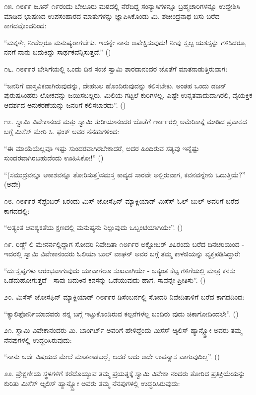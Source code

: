 ೧೫. ೧೮೯೯ ಜೂನ್ ೧೯ರಂದು ಬೇಲೂರು ಮಠದಲ್ಲಿ ನೆರೆದಿದ್ದ ಸಂನ್ಯಾಸಿಗಳನ್ನೂ ಬ್ರಹ್ಮಚಾರಿಗಳನ್ನೂ ಉದ್ದೇಶಿಸಿ ಮಾಡಿದ ಭಾಷಣದ ಉಪಸಂಹಾರದ ಮಾತುಗಳನ್ನು ಜ್ಞಾಪಿಸಿಕೊಂಡು ಮಿ. ಶಚೀಂದ್ರನಾಥ ಬಸು ಬರೆದ ಕಾಗದವೊಂದರಿಂದ:

“ಮಕ್ಕಳೇ, ನೀವೆಲ್ಲರೂ ಮನುಷ್ಯರಾಗಬೇಕು. ಇದನ್ನೇ ನಾನು ಅಪೇಕ್ಷಿಸುವುದು! ನೀವು ಸ್ವಲ್ಪ ಯಶಸ್ಸನ್ನು ಗಳಿಸಿದರೂ, ನನಗೆ ನಾನು ಬದುಕಿದ್ದು ಸಾರ್ಥಕವೆನ್ನಿಸುತ್ತದೆ.” ()

೧೬. ೧೮೯೯ರ ಬೇಸಿಗೆಯಲ್ಲಿ ಒಂದು ದಿನ ಸಂಜೆ ಸ್ವಾಮಿ ಶಾರದಾನಂದರ ಜೊತೆಗೆ ಮಾತನಾಡುತ್ತಿರುವಾಗ:

“ಜನರಿಗೆ ವಾಸ್ತವಿಕವಾಗಿರುವುದನ್ನು, ದೇಹಬಲ ಹೊಂದಿರುವುದನ್ನು ಕಲಿಸಬೇಕು. ಅಂತಹ ಒಂದು ಡಜನ್ ಪುರುಷಸಿಂಹರು ಲೋಕವನ್ನು ಜಯಿಸಬಲ್ಲರು, ಮಿಲಿಯ ಗಟ್ಟಲೆ ಕುರಿಗಳಲ್ಲ. ಎಷ್ಟೇ ಉನ್ನತವಾದುದಾಗಿರಲಿ, ವೈಯಕ್ತಿಕ ಆದರ್ಶದ ಅನುಕರಣೆಯನ್ನು ಜನರಿಗೆ ಕಲಿಸಬಾರದು”. ()

೧೭. ಸ್ವಾಮಿ ವಿವೇಕಾನಂದ ಮತ್ತು ಸ್ವಾಮಿ ತುರೀಯಾನಂದರ ಜೊತೆಗೆ ೧೮೯೯ರಲ್ಲಿ ಅಮೆರಿಕಾಕ್ಕೆ ಮಾಡಿದ ಪ್ರವಾಸದ ಬಗ್ಗೆ ಮಿಸೆಸ್ ಮೇರಿ ಸಿ. ಫಂಕ್ ಅವರ ನೆನಹುಗಳಿಂದ:

“ಈ ಮಾಯೆಯೆಲ್ಲವೂ ಇಷ್ಟು ಸುಂದರವಾಗಿರಬೇಕಾದರೆ, ಅದರ ಹಿಂದಿರುವ ಸತ್ಯವು ಇನ್ನೆಷ್ಟು ಸುಂದರವಾಗಿರಬಹುದೆಂದು ಊಹಿಸಿಕೋ!” ()

“(ಸಮುದ್ರವನ್ನೂ ಆಕಾಶವನ್ನೂ ತೋರಿಸುತ್ತ)ಸಮಸ್ತ ಕಾವ್ಯದ ಸಾರವೇ ಅಲ್ಲಿರುವಾಗ, ಕವನವನ್ನೇನು ಓದುತ್ತಿಯೆ?” (ಅದೇ)

೧೮. ೧೮೯೯ರ ಸೆಪ್ಟೆಂಬರ್ ೩ರಂದು ಮಿಸ್ ಜೋಸೆಫಿನ್ ಮ್ಯಾಕ್ಲಿಯಾಡ್ ಮಿಸೆಸ್ ಓಲ್ ಬುಲ್ ಅವರಿಗೆ ಬರೆದ ಕಾಗದದಲ್ಲಿ:

“ಅತ್ಯಂತ ಆವಶ್ಯಕತೆಯ ಕ್ಷಣದಲ್ಲಿ ಮನುಷ್ಯನು ನಿಲ್ಲುವುದು ಒಬ್ಬಂಟಿಯಾಗಿಯೇ”. ()

೧೯. ರಿಡ್ಜ್ ಲಿ ಮೇನರ್ನಲ್ಲಿದ್ದಾಗ ಸೋದರಿ ನಿವೇದಿತಾ ೧೮೯೯ರ ಅಕ್ಟೋಬರ್ ೨೭ರಂದು ಬರೆದ ದಿನಚರಿಯಿಂದ - ಇದರಲ್ಲಿ ಸ್ವಾಮಿ ವಿವೇಕಾನಂದರು ಓಲಿಯಾ ಬುಲ್ ವಾಘನ್ ಅವರ ಬಗ್ಗೆ ತಮ್ಮ ಕಾಳಜಿಯನ್ನು ವ್ಯಕ್ತಪಡಿಸಿದ್ದಾರೆ:

“ದುಃಸ್ವಪ್ನಗಳು ಆರಂಭವಾಗುವುದು ಯಾವಾಗಲೂ ಸುಖವಾಗಿಯೇ - ಅತ್ಯಂತ ಕೆಟ್ಟ ಗಳಿಗೆಯಲ್ಲಿ ಮಾತ್ರ ಕನಸು ಒಡೆದುಹೋಗುತ್ತದೆ - ಸಾವು ಬದುಕಿನ ಕನಸನ್ನು ಒಡೆಯುವುದು ಹಾಗೆ. ಸಾವನ್ನೇ ಪ್ರೀತಿಸು”. ()

೨೦. ಮಿಸೆಸ್ ಜೋಸೆಫಿನ್ ಮ್ಯಾಕ್ಲಿಯಾಡ್ ೧೮೯೯ರ ಡಿಸೆಂಬರ್ನಲ್ಲಿ ಸೋದರಿ ನಿವೇದಿತಾಳಿಗೆ ಬರೆದ ಕಾಗದದಿಂದ:

“ಕ್ಯಾಲಿಫೋರ್ನಿಯಾದವರು ನನ್ನ ಬಗ್ಗೆ ಇಟ್ಟುಕೊಂಡಿರುವ ಕಲ್ಪನೆಗಳೆಲ್ಲ ಬಂದಿರು ವುದು ಚಿಕಾಗೋದಿಂದಲೇ”. ()

೨೧. ಸ್ವಾಮಿ ವಿವೇಕಾನಂದರು ಮಿ. ಬಾಂಗರ್ಟ್ ಅವರಿಗೆ ಹೇಳಿದ್ದೆಂದು ಮಿಸೆಸ್ ಆ್ಯಲಿಸ್ ಹ್ಯಾನ್ಸ್ಬ್ರೋ ಅವರು ತಮ್ಮ ನೆನಪುಗಳಲ್ಲಿ ಉದ್ಧರಿಸಿರುವುದು:

“ನಾನು ಅದೇ ವಿಷಯದ ಮೇಲೆ ಮಾತನಾಡಬಲ್ಲೆ, ಆದರೆ ಅದು ಅದೇ ಉಪನ್ಯಾಸ ವಾಗುವುದಿಲ್ಲ”. ()

೨೨. ಪ್ರೇಕ್ಷಣೀಯ ಸ್ಥಳಗಳಿಗೆ ಕರೆದೊಯ್ಯುವ ತಮ್ಮ ಪ್ರಯತ್ನಕ್ಕೆ ಸ್ವಾಮಿ ವಿವೇಕಾ ನಂದರು ತೋರಿದ ಪ್ರತಿಕ್ರಿಯೆಯನ್ನು ಕುರಿತು ಮಿಸೆಸ್ ಆ್ಯಲಿಸ್ ಹ್ಯಾನ್ಸ್ಬ್ರೋ ಅವರು ತಮ್ಮ ನೆನಪುಗಳಲ್ಲಿ ಉದ್ಧರಿಸಿರುವುದು:

